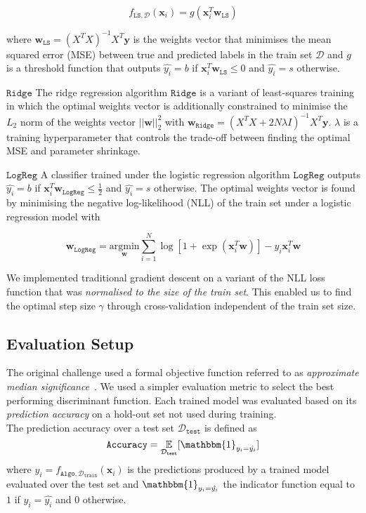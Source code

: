 \documentclass[10pt,conference,compsocconf]{IEEEtran}
\newcommand{\parabf}[1]{\vspace{1mm}\noindent\textbf{#1}}
\newcommand{\Data}{\mathcal{D}}
\newcommand{\Dtrain}{\mathcal{D}_{\mathtt{train}}}
\newcommand{\Dtest}{\mathcal{D}_{\mathtt{test}}}
\newcommand{\features}{\mathbf{x}_i}
\newcommand{\target}{y_i}
\newcommand{\targetvector}{\mathbf{y}}
\newcommand{\weights}{\mathbf{w}}
\newcommand{\classifier}[2]{f_{#1, #2}}
\newcommand{\Train}{\mathtt{Algo}}
\newcommand{\LeastSquares}{\mathtt{LS}}
\newcommand{\Ridge}{\mathtt{Ridge}}
\newcommand{\LogReg}{\mathtt{LogReg}}
\begin{document}
\vspace*{-4mm}
\begin{equation}
	\classifier{\LeastSquares}{\Data}(\features) = g(\features^T \weights_{\LeastSquares})
\end{equation}

where $\weights_{\LeastSquares} = (X^T X)^{-1}X^T \targetvector$ is the weights vector that minimises the mean squared error (MSE) between true and predicted labels in the train set $\Data$ and $g$ is a threshold function that outputs $\hat{\target} = b$ if $\features^T \weights_{\LeastSquares} \leq 0$ and $\hat{\target} = s$ otherwise.

\parabf{$\Ridge$} The ridge regression algorithm $\Ridge$ is a variant of least-squares training in which the optimal weights vector is additionally constrained to minimise the $L_2$ norm of the weights vector $||\weights||_2^2$ with $\weights_\Ridge = (X^T X + 2N\lambda I)^{-1}X^T \targetvector$. $\lambda$ is a training hyperparameter that controls the trade-off between finding the optimal MSE and parameter shrinkage.

\parabf{$\LogReg$} A classifier trained under the logistic regression algorithm $\LogReg$ outputs $\hat{\target} = b$ if $\features^T \weights_{\LogReg} \leq \frac{1}{2}$ and $\hat{\target} = s$ otherwise. The optimal weights vector is found by minimising the negative log-likelihood (NLL) of the train set under a logistic regression model with

\vspace*{-4mm}
\begin{equation}
	\weights_\LogReg = \underset{\weights}{\text{argmin}} \sum_{i=1}^{N} \log [ 1 + \exp(\features^T\weights) ] - \target\features^T\weights
\end{equation} 

We implemented traditional gradient descent on a variant of the NLL loss function that was \emph{normalised to the size of the train set}. This enabled us to find the optimal step size $\gamma$ through cross-validation independent of the train set size.

\subsection{Evaluation Setup}
The original challenge used a formal objective function referred to as \emph{approximate median significance}~\cite{HiggsML}. We used a simpler evaluation metric to select the best performing discriminant function. Each trained model was evaluated based on its \emph{prediction accuracy} on a hold-out set not used during training.\\
The prediction accuracy over a test set $\Dtest$ is defined as
\begin{equation}
	\mathtt{Accuracy} = \underset{\Dtest}{\mathbb{E}}[ \mathbbm{1}_{\target = \hat{\target}} ]
\end{equation}
where $\hat{\target} = \classifier{\Train}{\Dtrain}(\features)$ is the predictions produced by a trained model evaluated over the test set and $\mathbbm{1}_{\target = \hat{\target}}$ the indicator function equal to $1$ if $\target = \hat{\target}$ and $0$ otherwise.
\end{document}
